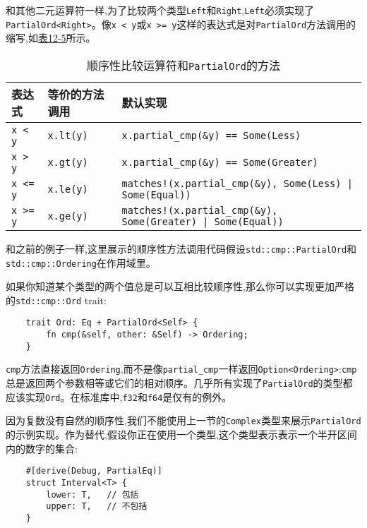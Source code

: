 和其他二元运算符一样,为了比较两个类型\texttt{Left}和\texttt{Right},\texttt{Left}必须实现了\texttt{PartialOrd<Right>}。像\texttt{x < y}或\texttt{x >= y}这样的表达式是对\texttt{PartialOrd}方法调用的缩写,如\hyperref[t12-5]{表12-5}所示。

\begin{table}[htbp]
    \centering
    \caption{顺序性比较运算符和\texttt{PartialOrd}的方法}
    \label{t12-5}
    \begin{tabular}{lll}
        \hline
        \textbf{表达式} & \textbf{等价的方法调用}   & \textbf{默认实现} \\
        \hline

        \texttt{x < y}  & \texttt{x.lt(y)}  & \texttt{x.partial\_cmp(\&y) == Some(Less)}    \\
        \rowcolor{tablecolor}
        \texttt{x > y}  & \texttt{x.gt(y)}  & \texttt{x.partial\_cmp(\&y) == Some(Greater)} \\
        \texttt{x <= y} & \texttt{x.le(y)}  & \texttt{matches!(x.partial\_cmp(\&y), Some(Less) | Some(Equal))}  \\
        \rowcolor{tablecolor}
        \texttt{x >= y} & \texttt{x.ge(y)}  & \texttt{matches!(x.partial\_cmp(\&y), Some(Greater) | Some(Equal))}   \\
    \end{tabular}
\end{table}

和之前的例子一样,这里展示的顺序性方法调用代码假设\texttt{std::cmp::PartialOrd}和\texttt{std::cmp::Ordering}在作用域里。

如果你知道某个类型的两个值总是可以互相比较顺序性,那么你可以实现更加严格的\texttt{std::cmp::Ord} trait:
\begin{verbatim}
    trait Ord: Eq + PartialOrd<Self> {
        fn cmp(&self, other: &Self) -> Ordering;
    }
\end{verbatim}

\texttt{cmp}方法直接返回\texttt{Ordering},而不是像\texttt{partial\_cmp}一样返回\texttt{Option<Ordering>}:\texttt{cmp}总是返回两个参数相等或它们的相对顺序。几乎所有实现了\texttt{PartialOrd}的类型都应该实现\texttt{Ord}。在标准库中,\texttt{f32}和\texttt{f64}是仅有的例外。

因为复数没有自然的顺序性,我们不能使用上一节的\texttt{Complex}类型来展示\texttt{PartialOrd}的示例实现。作为替代,假设你正在使用一个类型,这个类型表示表示一个半开区间内的数字的集合:
\begin{verbatim}
    #[derive(Debug, PartialEq)]
    struct Interval<T> {
        lower: T,   // 包括
        upper: T,   // 不包括
    }
\end{verbatim}

